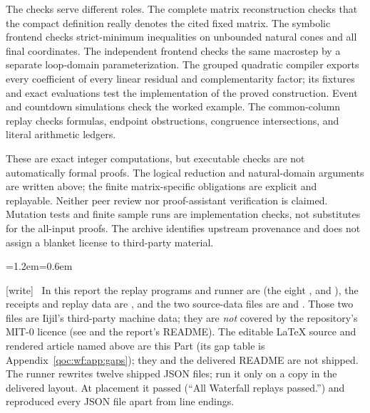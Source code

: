 \documentclass[11pt,letterpaper]{article}
\theoremstyle{definition}
\theoremstyle{remark}
\newcounter{qocsavedequation}\newcounter{qocsavedtable}\newcounter{qocsavedfigure}%
\newcommand{\wtag}{\textup{[write]}}
\newenvironment{writenote}{\par\smallskip\begin{list}{}{\leftmargin=1.2em\rightmargin=0.6em}\item[]\small\wtag\ }{\end{list}\smallskip}
\begin{document}
The checks serve different roles. The complete matrix reconstruction checks that the compact definition really denotes the cited fixed matrix. The symbolic frontend checks strict-minimum inequalities on unbounded natural cones and all final coordinates. The independent frontend checks the same macrostep by a separate loop-domain parameterization. The grouped quadratic compiler exports every coefficient of every linear residual and complementarity factor; its fixtures and exact evaluations test the implementation of the proved construction. Event and countdown simulations check the worked example. The common-column replay checks formulas, endpoint obstructions, congruence intersections, and literal arithmetic ledgers.

These are exact integer computations, but executable checks are not automatically formal proofs. The logical reduction and natural-domain arguments are written above; the finite matrix-specific obligations are explicit and replayable. Neither peer review nor proof-assistant verification is claimed. Mutation tests and finite sample runs are implementation checks, not substitutes for the all-input proofs. The archive identifies upstream provenance and does not assign a blanket license to third-party material.

\begin{writenote}
In this report the replay programs and runner are  (the eight ,  and ), the receipts and replay data are , and the two source-data files are  and . Those two files are Iijil's third-party machine data; they are \emph{not} covered by the repository's MIT-0 licence (see  and the report's README). The editable LaTeX source and rendered article named above are this Part (its gap table is Appendix~\ref{qoc:wf:app:gaps}); they and the delivered README are not shipped. The runner rewrites twelve shipped JSON files; run it only on a copy in the delivered layout. At placement it passed (``All Waterfall replays passed.'') and reproduced every JSON file apart from line endings.
\end{writenote}

\setcounter{qocsavedequation}{\value{equation}}\setcounter{qocsavedtable}{\value{table}}\setcounter{qocsavedfigure}{\value{figure}}
\end{document}
